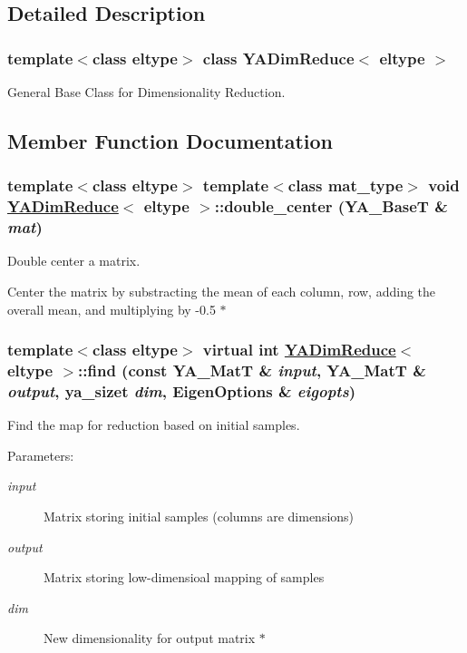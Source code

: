 \subsection{Detailed Description}
\subsubsection*{template$<$class eltype$>$ class YADim\-Reduce$<$ eltype $>$}

General Base Class for Dimensionality Reduction. 



\subsection{Member Function Documentation}
\hypertarget{class_y_a_dim_reduce_a36}{
\subsubsection[double\_\-center]{\setlength{\rightskip}{0pt plus 5cm}template$<$class eltype$>$ template$<$class mat\_\-type$>$ void \hyperlink{class_y_a_dim_reduce}{YADim\-Reduce}$<$ eltype $>$::double\_\-center (YA\_\-Base\-T \& {\em mat})}}
\label{class_y_a_dim_reduce_a36}


Double center a matrix. 

Center the matrix by substracting the mean of each column, row, adding the overall mean, and multiplying by -0.5 $\ast$ \hypertarget{class_y_a_dim_reduce_a8}{
\subsubsection[find]{\setlength{\rightskip}{0pt plus 5cm}template$<$class eltype$>$ virtual int \hyperlink{class_y_a_dim_reduce}{YADim\-Reduce}$<$ eltype $>$::find (const YA\_\-Mat\-T \& {\em input}, YA\_\-Mat\-T \& {\em output}, ya\_\-sizet {\em dim}, Eigen\-Options \& {\em eigopts})}}
\label{class_y_a_dim_reduce_a8}


Find the map for reduction based on initial samples. 

\begin{Desc}
\item[Parameters:]
\begin{description}
\item[{\em input}]Matrix storing initial samples (columns are dimensions) \item[{\em output}]Matrix storing low-dimensioal mapping of samples \item[{\em dim}]New dimensionality for output matrix $\ast$ \end{description}
\end{Desc}


